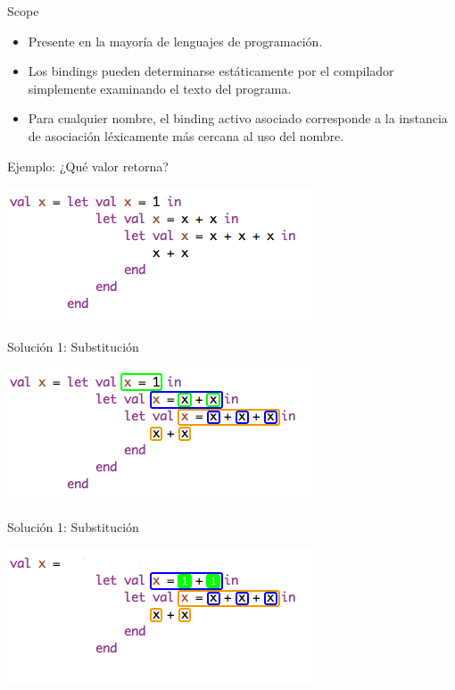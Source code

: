 \documentclass{beamer} %
\begin{document}
\begin{frame}{Scope}
    \begin{itemize}
        \item<1-> Presente en la mayoría de lenguajes de programación.
        \item<1-> Los bindings pueden determinarse estáticamente por el compilador simplemente examinando el texto del programa.
        \item<2-> Para cualquier nombre, el binding activo asociado corresponde a la instancia de asociación léxicamente más cercana al uso del nombre.
    \end{itemize}
\end{frame}

\begin{frame}{Ejemplo: ¿Qué valor retorna?}
    \begin{center}
        \includegraphics[width=.9\textwidth]{./image/cap5/scope01}
    \end{center}
\end{frame}

\begin{frame}{Solución 1: Substitución}
    \begin{center}
        \includegraphics[width=.9\textwidth]{./image/cap5/scope02}
    \end{center}
\end{frame}

\begin{frame}{Solución 1: Substitución}
    \begin{center}
        \includegraphics[width=.9\textwidth]{./image/cap5/scope03}
    \end{center}
\end{frame}
\end{document}
